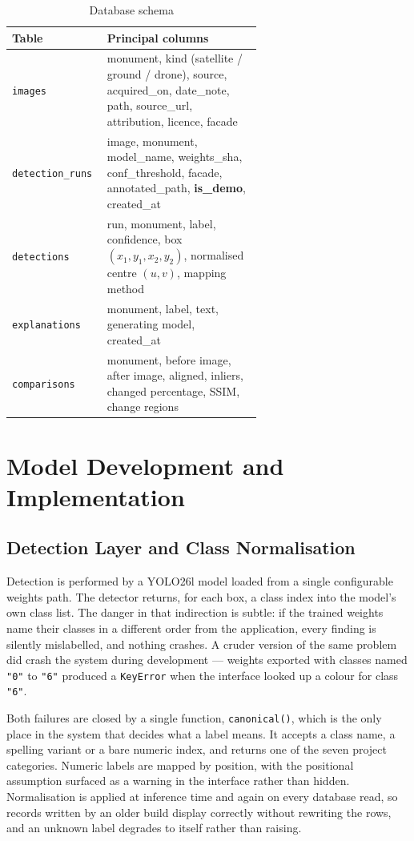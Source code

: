 \documentclass[a4paper,12pt,oneside]{book}
\begin{document}
\begin{table}[H]
\centering
\caption{Database schema}
\label{tab:schema}
\renewcommand{\arraystretch}{1.2}
{\footnotesize
\begin{tabular}{|l|p{0.62\linewidth}|}
\hline
\textbf{Table} & \textbf{Principal columns} \\ \hline
\texttt{images} & monument, kind (satellite / ground / drone), source, acquired\_on, date\_note, path, source\_url, attribution, licence, facade \\ \hline
\texttt{detection\_runs} & image, monument, model\_name, weights\_sha, conf\_threshold, facade, annotated\_path, \textbf{is\_demo}, created\_at \\ \hline
\texttt{detections} & run, monument, label, confidence, box $(x_1, y_1, x_2, y_2)$, normalised centre $(u, v)$, mapping method \\ \hline
\texttt{explanations} & monument, label, text, generating model, created\_at \\ \hline
\texttt{comparisons} & monument, before image, after image, aligned, inliers, changed percentage, SSIM, change regions \\ \hline
\end{tabular}}
\end{table}

\section{Model Development and Implementation}

\subsection{Detection Layer and Class Normalisation}
Detection is performed by a YOLO26l model loaded from a single configurable weights path. The detector returns, for each box, a class index into the model's own class list. The danger in that indirection is subtle: if the trained weights name their classes in a different order from the application, every finding is silently mislabelled, and nothing crashes. A cruder version of the same problem did crash the system during development --- weights exported with classes named \texttt{"0"} to \texttt{"6"} produced a \texttt{KeyError} when the interface looked up a colour for class \texttt{"6"}.

Both failures are closed by a single function, \texttt{canonical()}, which is the only place in the system that decides what a label means. It accepts a class name, a spelling variant or a bare numeric index, and returns one of the seven project categories. Numeric labels are mapped by position, with the positional assumption surfaced as a warning in the interface rather than hidden. Normalisation is applied at inference time and again on every database read, so records written by an older build display correctly without rewriting the rows, and an unknown label degrades to itself rather than raising.
\end{document}
